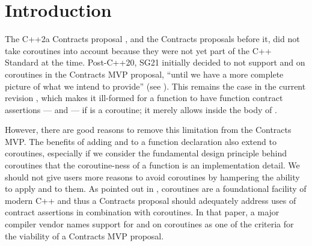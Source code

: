 
\tableofcontents*





\section{Introduction}
\label{intro}

The C++2a Contracts proposal \cite{P0542R5}, and the Contracts proposals before it, did not take coroutines into account because they were not yet part of the C++ Standard at the time. Post-C++20, SG21 initially decided to not support  and  on coroutines in the Contracts MVP proposal, ``until we have a more complete picture of what we intend to provide'' (see \cite{P2932R3}). This remains the case in the current revision \cite{P2900R8}, which makes it ill-formed for a function  to have function contract assertions ---  and  --- if  is a coroutine; it merely allows  inside the body of . 

However, there are good reasons to remove this limitation from the Contracts MVP. The benefits of adding  and  to a function declaration also extend to coroutines, especially if we consider the fundamental design principle behind coroutines  that the coroutine-ness of a function is an implementation detail. We should not give users more reasons to avoid coroutines by hampering the ability to apply  and  to them. As pointed out in \cite{P3173R0}, coroutines are a foundational facility of modern C++ and thus a Contracts proposal should adequately address uses of contract assertions in combination with coroutines. In that paper, a major compiler vendor names support for  and  on coroutines as one of the criteria for the viability of a Contracts MVP proposal.

